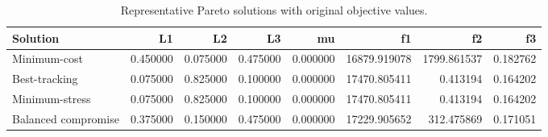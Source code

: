 \begin{table}
\caption{Representative Pareto solutions with original objective values.}
\label{tab:representative-solutions}
\begin{tabular}{lrrrrrrr}
\toprule
Solution & L1 & L2 & L3 & mu & f1 & f2 & f3 \\
\midrule
Minimum-cost & 0.450000 & 0.075000 & 0.475000 & 0.000000 & 16879.919078 & 1799.861537 & 0.182762 \\
Best-tracking & 0.075000 & 0.825000 & 0.100000 & 0.000000 & 17470.805411 & 0.413194 & 0.164202 \\
Minimum-stress & 0.075000 & 0.825000 & 0.100000 & 0.000000 & 17470.805411 & 0.413194 & 0.164202 \\
Balanced compromise & 0.375000 & 0.150000 & 0.475000 & 0.000000 & 17229.905652 & 312.475869 & 0.171051 \\
\bottomrule
\end{tabular}
\end{table}
